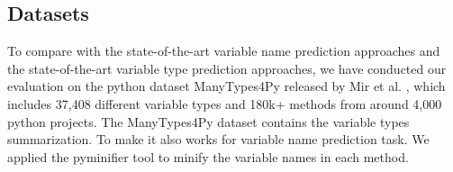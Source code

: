 \subsection{Datasets}

To compare with the state-of-the-art variable name prediction approaches and the state-of-the-art variable type prediction approaches, we have conducted our evaluation on the python dataset ManyTypes4Py released by Mir et al. \cite{mir2021manytypes4py}, which includes 37,408 different variable types and 180k+ methods from around 4,000 python projects. The ManyTypes4Py dataset contains the variable types summarization. To make it also works for variable name prediction task. We applied the pyminifier \cite{pyminifier} tool to minify the variable names in each method.
